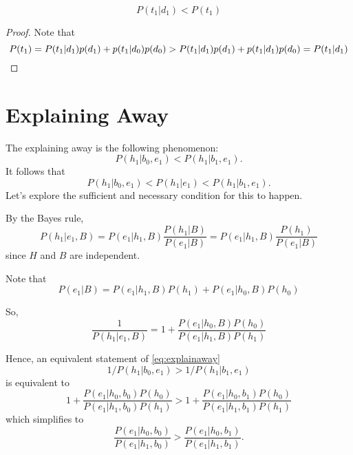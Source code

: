 \documentclass{discussion}
\begin{document}
\begin{corollary}
\[	P(t_1 | d_1) < P(t_1)\]
\end{corollary}
\begin{proof}
	Note that 
	\[P(t_1) = P(t_1 | d_1) p(d_1) + p(t_1 | d_0) p(d_0) > P(t_1 | d_1) p(d_1) + p(t_1 | d_1) p(d_0) = P(t_1 | d_1)\qedhere\]
\end{proof}


\section{Explaining Away}
The explaining away is the following phenomenon:
\begin{equation}
\label{eq:explainaway}
	P(h_1 | b_0, e_1) < P(h_1 | b_1, e_1).
\end{equation}
It follows that
\[P(h_1 | b_0, e_1) < P(h_1 | e_1)< P(h_1 | b_1, e_1).\]
Let's explore the sufficient and necessary condition for this to happen.

By the Bayes rule,
\[P(h_1 | e_1, B) = P(e_1 | h_1, B) \frac{P(h_1 | B)}{P(e_1 | B)} = P(e_1 | h_1, B) \frac{P(h_1)}{P(e_1 | B)}\]
since $H$ and $B$ are independent.



Note that
\[P(e_1 | B) = P(e_1 | h_1, B)P(h_1) + P(e_1 | h_0, B)P(h_0)\]

So, 
\[\frac{1}{P(h_1|e_1,B)}
= 1 + \frac{P(e_1 | h_0, B)P(h_0)}{P(e_1|h_1,B)P(h_1)}\]

Hence, an equivalent statement of \eqref{eq:explainaway}
\[	1/P(h_1 | b_0, e_1) > 1/P(h_1 | b_1, e_1)
\]
is equivalent to 
\[1 + \frac{P(e_1 | h_0, b_0)P(h_0)}{P(e_1|h_1,b_0)P(h_1)} > 1 + \frac{P(e_1 | h_0, b_1)P(h_0)}{P(e_1|h_1,b_1)P(h_1)}
\]
which simplifies to
\[\frac{P(e_1 | h_0, b_0)}{P(e_1|h_1,b_0)} > \frac{P(e_1 | h_0, b_1)}{P(e_1|h_1,b_1)}.\]
\end{document}
